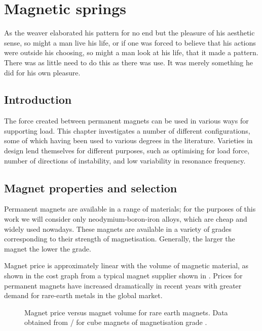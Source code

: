 \documentclass[11pt,a4paper]{memoir}
\begin{document}
\chapter{Magnetic springs}

\epigraph {
  As the weaver elaborated his pattern for no end but the pleasure of his aesthetic sense, so might a man live his life, or if one was forced to believe that his actions were outside his choosing, so might a man look at his life, that it made a pattern.
  There was as little need to do this as there was use.
  It was merely something he did for his own pleasure.
}
{\textcite{maugham1915}}

\section{Introduction}

The force created between permanent magnets can be used in various ways for supporting load.
This chapter investigates a number of different configurations, some of which having been used to various degrees in the literature.
Varieties in design lend themselves for different purposes, such as optimising for load force, number of directions of instability, and low variability in resonance frequency.


\section{Magnet properties and selection}

Permanent magnets are available in a range of materials; for the purposes of this work we will consider only neodymium-boron-iron alloys, which are cheap and widely used nowadays.
These magnets are available in a variety of grades corresponding to their strength of magnetisation.
Generally, the larger the magnet the lower the grade.

Magnet price is approximately linear with the volume of magnetic material, as shown in the cost graph from a typical magnet supplier shown in .
Prices for permanent magnets have increased dramatically in recent years with greater demand for rare-earth metals in the global market.

\begin{figure}
  \caption{Magnet price versus magnet volume for rare earth magnets.
    Data obtained from \KJMagnetics/ for cube magnets of magnetisation grade .}
\end{figure}
\end{document}
